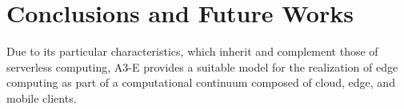 \section{Conclusions and Future Works}\label{sec:conclusions}

Due to its particular characteristics, which inherit and complement those of serverless computing, A3-E provides a suitable model for the realization of edge computing as part of a  computational continuum composed of cloud, edge, and mobile clients.
